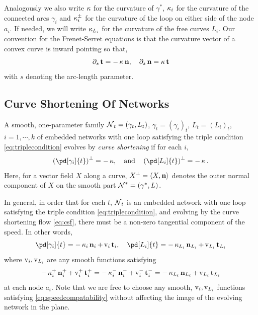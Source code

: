 \documentclass[11pt]{amsart}
\begin{document}
Analogously we also write \(\operatorname{\kappa}\) for the curvature of \(\gamma^{\ast}\), \(\operatorname{\kappa}_i\) for the curvature of the connected arcs \(\gamma_i\) and \(\operatorname{\kappa}^{\pm}_i\) for the curvature of the loop on either side of the node \(a_i\). If needed, we will write \(\operatorname{\kappa}_{L_i}\) for the curvature of the free curves \(L_i\). Our convention for the Frenet-Serret equations is that the curvature vector of a convex curve is inward pointing so that,
\begin{equation}
\label{eq:frenetserret}
\partial_s \operatorname{\mathbf{t}} = -\operatorname{\kappa} \operatorname{\mathbf{n}}, \quad \partial_s \operatorname{\mathbf{n}} = \operatorname{\kappa} \operatorname{\mathbf{t}}
\end{equation}
with \(s\) denoting the arc-length parameter.

\subsection{Curve Shortening Of Networks}
\label{sec:orgheadline3}

\begin{defn}
A smooth, one-parameter family \(\operatorname{\mathcal{N}}_t = (\gamma_t, L_t)\), \(\gamma_t = (\gamma_i)_t\), \(L_t = (L_i)_t\), \(i=1,\cdots,k\) of embedded networks with one loop satisfying the triple condition \eqref{eq:triplecondition} evolves by \emph{curve shortening} if for each \(i\),
\begin{equation}
\label{eq:csf}
\left(\pd[\gamma_i]{t}\right)^{\perp} = -\curvecurv, \quad \text{and} \quad \left(\pd[L_i]{t}\right)^{\perp} = -\curvecurv.
\end{equation}
Here, for a vector field \(X\) along a curve, \(X^{\perp} = \langle{X},{\operatorname{\mathbf{n}}}\rangle\) denotes the outer normal component of \(X\) on the smooth part \(\operatorname{\mathcal{N}}^{\ast} = (\gamma^{\ast}, L)\).
\end{defn}

In general, in order that for each \(t\), \(\operatorname{\mathcal{N}}_t\) is an embedded network with one loop satisfying the triple condition \eqref{eq:triplecondition}, and evolving by the curve shortening flow \eqref{eq:csf}, there must be a non-zero tangential component of the speed. In other words,
\begin{equation}
\label{eq:csf_with_tang}
\pd[\gamma_i]{t} = -\curvecurv_i \nor_i + \tangspeed_i \tang_i, \quad \pd[L_i]{t} = -\curvecurv_{L_i} \nor_{L_i} + \tangspeed_{L_i} \tang_{L_i}
\end{equation}
where \(\operatorname{v}_i, \operatorname{v}_{L_i}\) are any smooth functions satisfying
\begin{equation}
\label{eq:speedcompatability}
-\operatorname{\kappa}_i^+ \operatorname{\mathbf{n}}_i^+ + \operatorname{v}_i^+ \operatorname{\mathbf{t}}_i^+ = -\operatorname{\kappa}_i^- \operatorname{\mathbf{n}}_i^- + \operatorname{v}_i^- \operatorname{\mathbf{t}}_i^- = -\operatorname{\kappa}_{L_i} \operatorname{\mathbf{n}}_{L_i} + \operatorname{v}_{L_i} \operatorname{\mathbf{t}}_{L_i}
\end{equation}
at each node \(a_i\). Note that we are free to choose any smooth, \(\operatorname{v}_i, \operatorname{v}_{L_i}\) functions satisfying \eqref{eq:speedcompatability} without affecting the image of the evolving network in the plane.
\end{document}

